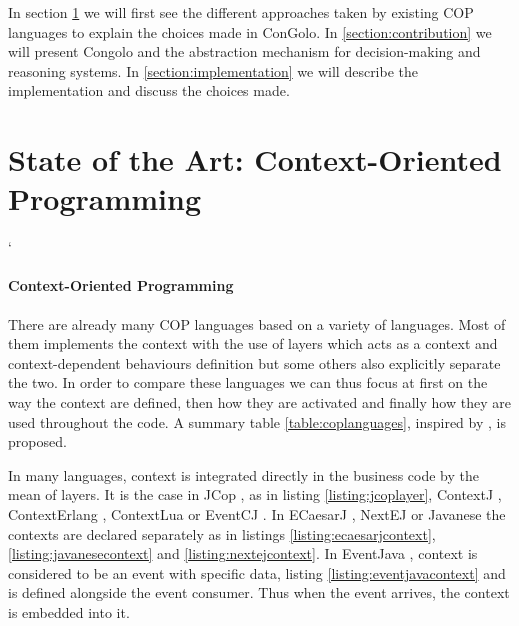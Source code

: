 \documentclass[a4paper]{article}
\begin{document}
In section \ref{section:stateoftheart} we will first see the different approaches taken by existing COP languages to explain the choices made in ConGolo. In \ref{section:contribution} we will present Congolo and the abstraction mechanism for decision-making and reasoning systems. In \ref{section:implementation} we will describe the implementation and discuss the choices made.



\section{State of the Art: Context-Oriented Programming}
\label{section:stateoftheart}
`
\paragraph{Context-Oriented Programming}
There are already many COP languages based on a variety of languages. Most of them implements the context with the use of layers which acts as a context and context-dependent behaviours definition but some others also explicitly separate the two. In order to compare these languages we can thus focus at first on the way the context are defined, then how they are activated and finally how they are used throughout the code. A summary table \ref{table:coplanguages}, inspired by \cite{appeltauer_comparison_2009}, is proposed.

In many languages, context is integrated directly in the business code by the mean of layers. It is the case in JCop \cite{appeltauer_declarative_2012}, as in listing \ref{listing:jcoplayer}, ContextJ \cite{appeltauer_dedicated_2008} \cite{appeltauer_improving_2009}, ContextErlang \cite{ghezzi_context_2010}, ContextLua \cite{wasty_contextlua:_2010} or EventCJ \cite{kamina_eventcj:_2011}. In ECaesarJ \cite{nunez_declarative_2009}, NextEJ \cite{kamina_towards_2009} or Javanese \cite{kamina_unified_2013} the contexts are declared separately as in listings \ref{listing:ecaesarjcontext}, \ref{listing:javanesecontext} and \ref{listing:nextejcontext}. In EventJava \cite{jayaram_context-oriented_2009}, context is considered to be an event with specific data, listing \ref{listing:eventjavacontext} and is defined alongside the event consumer. Thus when the event arrives, the context is embedded into it.
\end{document}
